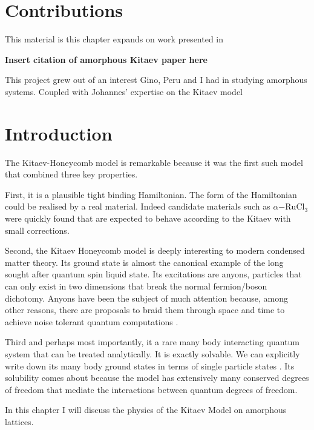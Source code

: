 \hypertarget{contributions}{%
\section{Contributions}\label{contributions}}

This material is this chapter expands on work presented in

\textbf{Insert citation of amorphous Kitaev paper here}

This project grew out of an interest Gino, Peru and I had in studying amorphous systems. Coupled with Johannes' expertise on the Kitaev model

\hypertarget{introduction}{%
\section{Introduction}\label{introduction}}

The Kitaev-Honeycomb model is remarkable because it was the first such model that combined three key properties.

First, it is a plausible tight binding Hamiltonian. The form of the Hamiltonian could be realised by a real material. Indeed candidate materials such as \(\alpha\mathrm{-RuCl}_3\) were quickly found \autocite{banerjeeProximateKitaevQuantum2016,trebstKitaevMaterials2022} that are expected to behave according to the Kitaev with small corrections.

Second, the Kitaev Honeycomb model is deeply interesting to modern condensed matter theory. Its ground state is almost the canonical example of the long sought after quantum spin liquid state. Its excitations are anyons, particles that can only exist in two dimensions that break the normal fermion/boson dichotomy. Anyons have been the subject of much attention because, among other reasons, there are proposals to braid them through space and time to achieve noise tolerant quantum computations \textcite{freedmanTopologicalQuantumComputation2003}.

Third and perhaps most importantly, it a rare many body interacting quantum system that can be treated analytically. It is exactly solvable. We can explicitly write down its many body ground states in terms of single particle states \textcite{kitaevAnyonsExactlySolved2006}. Its solubility comes about because the model has extensively many conserved degrees of freedom that mediate the interactions between quantum degrees of freedom.

In this chapter I will discuss the physics of the Kitaev Model on amorphous lattices.

